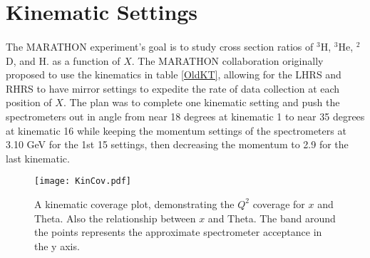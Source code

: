 \section{Kinematic Settings}\label{sec:kin}
\paragraph{} The MARATHON experiment's goal is to study cross section ratios of $^3$H, $^3$He, $^2$D, and H. as a function of $X$. The MARATHON collaboration originally proposed to use the kinematics in table \ref{OldKT}, allowing for the LHRS and RHRS to have mirror settings to expedite the rate of data collection at each position of $X$. The plan was to complete one kinematic setting and push the spectrometers out in angle from near 18 degrees at kinematic 1 to near 35 degrees at kinematic 16 while keeping the momentum settings of the spectrometers at 3.10 GeV for the 1st 15 settings, then decreasing the momentum to 2.9 for the last kinematic. 
\begin{figure}[t]
	\centering
	\texttt{[image: KinCov.pdf]}
	\caption{A kinematic coverage plot, demonstrating the $Q^2$ coverage for $x$ and Theta. Also the relationship between $x$ and Theta. The band around the points represents the approximate spectrometer acceptance in the y axis.}
	\label{fig:kincov}
\end{figure}  

